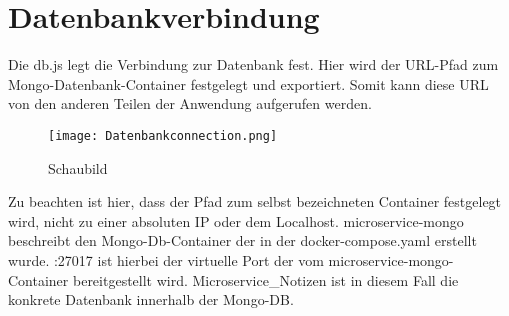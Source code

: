 
\chapter{Datenbankverbindung}
\label{ch:Datenbankverbindung}
Die db.js legt die Verbindung zur Datenbank fest. Hier wird der URL-Pfad zum Mongo-Datenbank-Container festgelegt und exportiert. Somit kann diese URL von den anderen Teilen der Anwendung aufgerufen werden.

\begin{figure}[h]
\texttt{[image: Datenbankconnection.png]}
\vspace{3pt}
\caption{Schaubild\footnotemark}
\label{fig:blueant}
\end{figure}

Zu beachten ist hier, dass der Pfad zum selbst bezeichneten Container festgelegt wird, nicht zu einer absoluten IP oder dem Localhost. \glqq  microservice-mongo\grqq{} beschreibt den Mongo-Db-Container der in der docker-compose.yaml erstellt wurde. \glqq  :27017\grqq{} ist hierbei der virtuelle Port der vom microservice-mongo-Container bereitgestellt wird. \glqq  Microservice\_Notizen\grqq{} ist in diesem Fall die konkrete Datenbank innerhalb der Mongo-DB.



